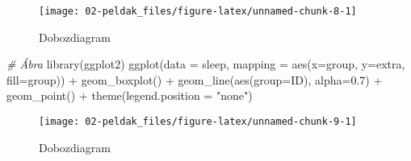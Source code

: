 \documentclass[
]{book}
\newenvironment{Shaded}{\begin{snugshade}}{\end{snugshade}}
\newcommand{\AttributeTok}[1]{\textcolor[rgb]{0.77,0.63,0.00}{#1}}
\newcommand{\CommentTok}[1]{\textcolor[rgb]{0.56,0.35,0.01}{\textit{#1}}}
\newcommand{\FloatTok}[1]{\textcolor[rgb]{0.00,0.00,0.81}{#1}}
\newcommand{\FunctionTok}[1]{\textcolor[rgb]{0.00,0.00,0.00}{#1}}
\newcommand{\NormalTok}[1]{#1}
\newcommand{\SpecialCharTok}[1]{\textcolor[rgb]{0.00,0.00,0.00}{#1}}
\newcommand{\StringTok}[1]{\textcolor[rgb]{0.31,0.60,0.02}{#1}}
\begin{document}
\begin{figure}

{\centering \texttt{[image: 02-peldak\_files/figure-latex/unnamed-chunk-8-1]} 

}

\caption{Dobozdiagram}\label{fig:unnamed-chunk-8}
\end{figure}

\begin{Shaded}
\begin{Highlighting}[]
\CommentTok{\# Ábra}
\FunctionTok{library}\NormalTok{(ggplot2)}
\FunctionTok{ggplot}\NormalTok{(}\AttributeTok{data =}\NormalTok{ sleep, }\AttributeTok{mapping =} \FunctionTok{aes}\NormalTok{(}\AttributeTok{x=}\NormalTok{group, }\AttributeTok{y=}\NormalTok{extra, }\AttributeTok{fill=}\NormalTok{group)) }\SpecialCharTok{+} 
  \FunctionTok{geom\_boxplot}\NormalTok{() }\SpecialCharTok{+} 
  \FunctionTok{geom\_line}\NormalTok{(}\FunctionTok{aes}\NormalTok{(}\AttributeTok{group=}\NormalTok{ID), }\AttributeTok{alpha=}\FloatTok{0.7}\NormalTok{) }\SpecialCharTok{+}  
  \FunctionTok{geom\_point}\NormalTok{() }\SpecialCharTok{+} 
  \FunctionTok{theme}\NormalTok{(}\AttributeTok{legend.position =} \StringTok{"none"}\NormalTok{) }
\end{Highlighting}
\end{Shaded}

\begin{figure}

{\centering \texttt{[image: 02-peldak\_files/figure-latex/unnamed-chunk-9-1]} 

}

\caption{Dobozdiagram}\label{fig:unnamed-chunk-9}
\end{figure}
\end{document}
